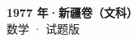 \documentclass[zihao=-4, a4paper]{ctexart}
\begin{document}
\begin{center}
  {\Large\bfseries 1977 年·新疆卷（文科）}\\[4pt]
  {\large 数学 · 试题版}
\end{center}
\medskip
{}

\end{document}
